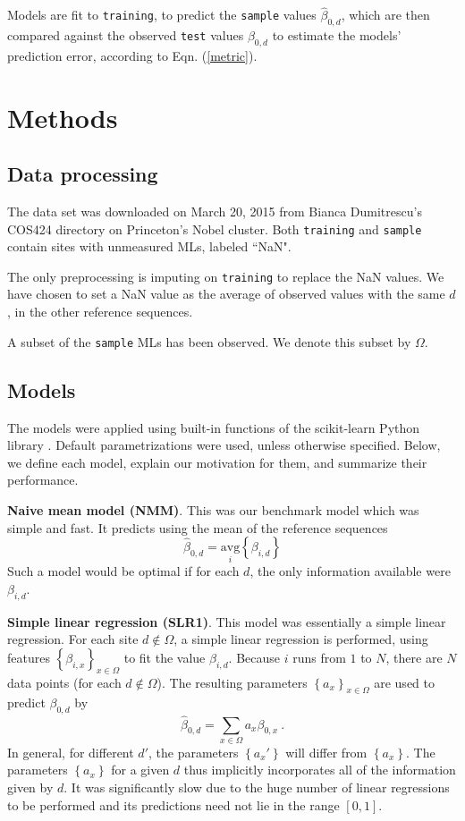 \documentclass{article} %
\begin{document}
Models are fit to \texttt{training}, to predict the \texttt{sample} values $\hat{\beta}_{0,d}$, which are then compared against the observed \texttt{test} values $\beta_{0,d}$ to estimate the models' prediction error, according to Eqn. (\ref{metric}).



\section{Methods}

\subsection{Data processing}

The data set was downloaded on March 20, 2015 from Bianca Dumitrescu's COS424 directory on Princeton's Nobel cluster. Both \texttt{training} and \texttt{sample} contain sites with unmeasured MLs, labeled ``NaN".

The only preprocessing is imputing on \texttt{training} to replace the NaN values. We have chosen to set a NaN value as the average of observed values with the same $d$, in the other reference sequences. 

A subset of the \texttt{sample} MLs has been observed. We denote this subset by $\Omega$.

\subsection{Models}

The models were applied using built-in functions of the scikit-learn Python library \cite{scikit-learn}. Default parametrizations were used, unless otherwise specified. Below, we define each model, explain our motivation for them, and summarize their performance.

\textbf{Naive mean model (NMM)}. This was our benchmark model which was simple and fast. It predicts using the mean of the reference sequences
\[ \hat{\beta}_{0,d} = \underset{i}{\text{avg}} \left\{ \beta_{i,d}\right\}\]
Such a model would be optimal if for each $d$, the only information available were $\beta_{i,d}$.

\textbf{Simple linear regression (SLR1)}. This model was essentially a simple linear regression. For each site $d \notin \Omega$, a simple linear regression is performed, using features $\left\{ \beta_{i,x} \right\}_{x \in \Omega}$ to fit the value $\beta_{i,d}$. Because $i$ runs from $1$ to $N$, there are $N$ data points (for each $d \notin \Omega$). The resulting parameters $\left\{ a_x\right\}_{x \in \Omega}$ are used to predict $\beta_{0,d}$ by
\begin{equation} \label{beta.sites}\hat{\beta}_{0,d} = \sum_{x \in \Omega} a_x \beta_{0,x} \ .\end{equation}
In general, for different $d'$, the parameters $\left\{a_x'\right\}$ will differ from $\left\{a_x\right\}$. The parameters $\left\{a_x\right\}$ for a given $d$ thus implicitly incorporates all of the information given by $d$. It was significantly slow due to the huge number of linear regressions to be performed and its predictions need not lie in the range $[0,1]$.
\end{document}
